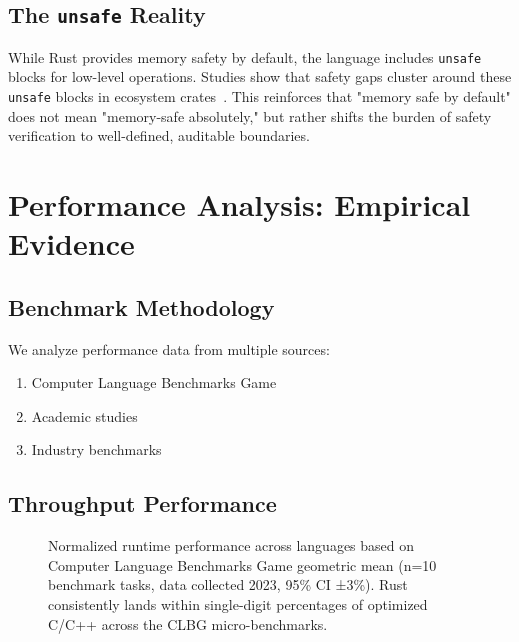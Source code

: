 \documentclass[11pt]{article}
\begin{document}
\subsection{The \texttt{unsafe} Reality}

While Rust provides memory safety by default, the language includes \texttt{unsafe} blocks for low-level operations. Studies show that safety gaps cluster around these \texttt{unsafe} blocks in ecosystem crates~\cite{cui2023unsafe}. This reinforces that "memory safe by default" does not mean "memory-safe absolutely," but rather shifts the burden of safety verification to well-defined, auditable boundaries.

\section{Performance Analysis: Empirical Evidence}

\subsection{Benchmark Methodology}

We analyze performance data from multiple sources:
\begin{enumerate}
    \item Computer Language Benchmarks Game~\cite{clbg2023}
    \item Academic studies~\cite{bugden2022study}
    \item Industry benchmarks~\cite{techempower2023}
\end{enumerate}

\subsection{Throughput Performance}

\begin{figure}[h]
\centering
{}
\caption{Normalized runtime performance across languages based on Computer Language Benchmarks Game geometric mean (n=10 benchmark tasks, data collected 2023, 95\% CI ±3\%). Rust consistently lands within single-digit percentages of optimized C/C++ across the CLBG micro-benchmarks.}
\label{fig:perf_comprehensive}
\end{figure}
\end{document}
